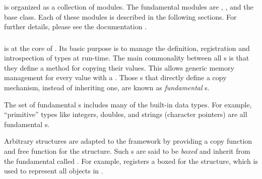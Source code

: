 \documentclass[article,shortnames]{jss}
\begin{document}
 is organized as a collection of modules. The fundamental
modules are , , and the base
 class. Each of these modules is described in the
following sections. For further details, please see the 
documentation \citep{gobject}.

\subsubsection{}
%



 is at the core of . Its basic purpose
is to manage the definition, registration and introspection of types
at run-time. The main commonality between all s is that
they define a method for copying their values. This allows generic
memory management for every value with a . Those
s that directly define a copy mechanism, instead of
inheriting one, are known as \emph{fundamental} s.


The set of fundamental s includes many of the built-in
 data types. For example, ``primitive'' types like
integers, doubles, and strings (character pointers) are all
fundamental s. 

Arbitrary  structures are adapted to the 
framework by providing a copy function and free function for the
structure. Such s are said to be \emph{boxed} and inherit
from the fundamental  called . For
example,  registers a boxed  for the
  structure, which is used to represent all
 objects in .
\end{document}
